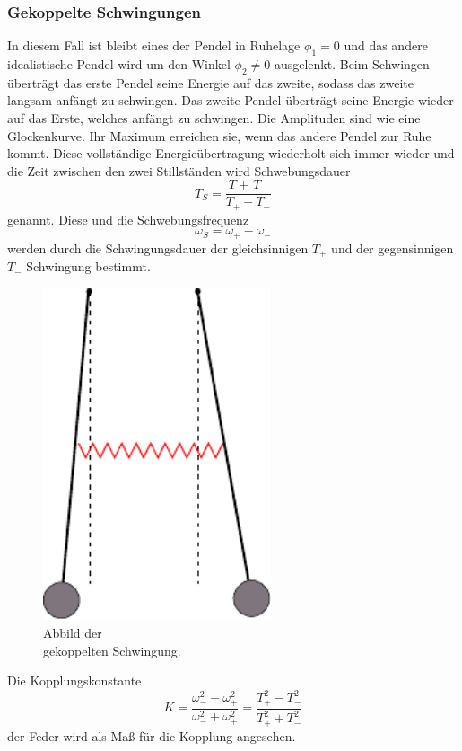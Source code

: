 \subsubsection{Gekoppelte Schwingungen}
\label{subsec:Gekoppelt}
\begin{minipage}[t]{0.5\textwidth}
In diesem Fall ist bleibt eines der Pendel in Ruhelage $\phi_1=0$ und das andere idealistische Pendel wird um den Winkel $\phi_2 \neq 0$ ausgelenkt.
Beim Schwingen überträgt das erste Pendel seine Energie auf das zweite, sodass das zweite langsam anfängt zu schwingen.
Das zweite Pendel überträgt seine Energie wieder auf das Erste, welches anfängt zu schwingen.
Die Amplituden sind wie eine Glockenkurve. 
Ihr Maximum erreichen sie, wenn das andere Pendel zur Ruhe kommt.
Diese vollständige Energieübertragung wiederholt sich immer wieder und die Zeit zwischen den zwei Stillständen wird Schwebungsdauer 
\begin{equation}
    T_S=\frac{T+\,T_-}{T_+-T_-}
    \label{eqn:TS}
\end{equation}
genannt. Diese und die Schwebungsfrequenz
\begin{equation}
    \omega_S = \omega_+ - \omega_-
    \label{eqn:omegaS}
\end{equation}
werden durch die Schwingungsdauer der gleichsinnigen $T_+$ und der gegensinnigen $T_-$ Schwingung bestimmt.

\end{minipage}
\begin{minipage}[t]{0.5\textwidth}
    \begin{figure}[H]
        \centering
        \includegraphics[width=0.6\textwidth]{build/Abb_3.pdf}
        \caption{Abbild der \\gekoppelten Schwingung. \cite{V106}}
        \label{fig:gekoppelt}
      \end{figure}
\end{minipage}
Die Kopplungskonstante
\begin{equation}
    K = \frac{\omega_-^2 -\omega_+^2}{\omega_-^2 + \omega_+^2} = \frac{T_+^2 - T_-^2}{T_+^2 + T_-^2}
    \label{eqn:K}
\end{equation}
der Feder wird als Maß für die Kopplung angesehen.
